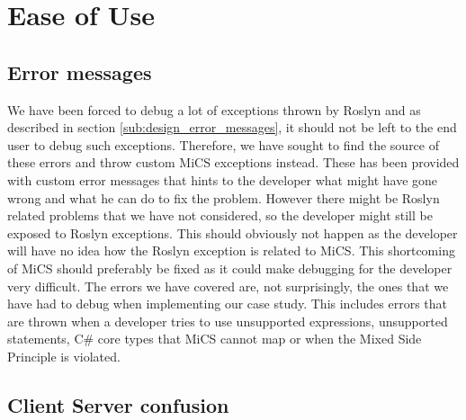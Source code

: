 \section{Ease of Use} %
\label{sec:ease_of_use}
	\subsection{Error messages} %
	\label{sub:evaluation_of_error_messages}
		We have been forced to debug a lot of exceptions thrown by Roslyn and as described in section \ref{sub:design_error_messages}, it should not be left to the end user to debug such exceptions. Therefore, we have sought to find the source of these errors and throw custom MiCS exceptions instead. These has been provided with custom error messages that hints to the developer what might have gone wrong and what he can do to fix the problem. However there might be Roslyn related problems that we have not considered, so the developer might still be exposed to Roslyn exceptions. This should obviously not happen as the developer will have no idea how the Roslyn exception is related to MiCS. This shortcoming of MiCS should preferably be fixed as it could make debugging for the developer very difficult. The errors we have covered are, not surprisingly, the ones that we have had to debug when implementing our case study. This includes errors that are thrown when a developer tries to use unsupported expressions, unsupported statements, C\# core types that MiCS cannot map or when the Mixed Side Principle is violated.

	\subsection{Client Server confusion} %
	\label{sub:client_server_confusion}
	








